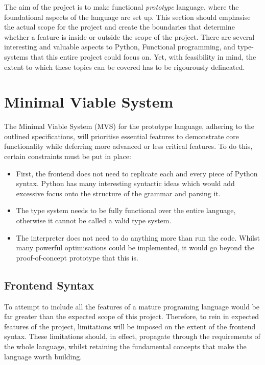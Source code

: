 \documentclass{l4proj}
\begin{document}

The aim of the project is to make functional \emph{prototype} language, where the foundational aspects of the language are set up.
This section should emphasise the actual scope for the project and create the boundaries that determine whether a feature is inside or outside the scope of the project.
There are several interesting and valuable aspects to Python, Functional programming, and type-systems that this entire project could focus on.
Yet, with feasibility in mind, the extent to which these topics can be covered has to be rigourously delineated.

\section{Minimal Viable System}

The Minimal Viable System (MVS) for the prototype language, adhering to the outlined specifications, will prioritise essential features to demonstrate core functionality while deferring more advanced or less critical features.
To do this, certain constraints must be put in place:

\begin{itemize}
    \item First, the frontend does not need to replicate each and every piece of Python syntax.
    Python has many interesting syntactic ideas which would add excessive focus onto the structure of the grammar and parsing it. 
    \item The type system needs to be fully functional over the entire language, otherwise it cannot be called a valid type system.
    \item The interpreter does not need to do anything more than run the code.
    Whilst many powerful optimisations could be implemented, it would go beyond the proof-of-concept prototype that this is.
\end{itemize}

\subsection{Frontend Syntax}

To attempt to include all the features of a mature programing language would be far greater than the expected scope of this project.
Therefore, to rein in expected features of the project, limitations will be imposed on the extent of the frontend syntax.
These limitations should, in effect, propagate through the requirements of the whole language, whilst retaining the fundamental concepts that make the language worth building.
\end{document}
